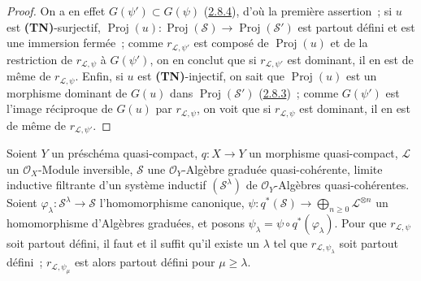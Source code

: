 \begin{proof}
On a en effet $G(\psi')\subset G(\psi)$
(\hyperref[II.2.8.4-fr]{2.8.4}), d'où la première assertion~; si $u$ est
\textbf{(TN)}-surjectif,
$\operatorname{Proj}(u):\operatorname{Proj}(\mathcal{S})\to
\operatorname{Proj}(\mathcal{S}')$ est partout défini et est une immersion
fermée~; comme $r_{\mathcal{L},\psi'}$ est composé de
$\operatorname{Proj}(u)$ et de la restriction de $r_{\mathcal{L},\psi}$ à
$G(\psi')$, on en conclut que si $r_{\mathcal{L},\psi'}$ est dominant, il en
est de même de $r_{\mathcal{L},\psi}$. Enfin, si $u$ est
\textbf{(TN)}-injectif, on sait que $\operatorname{Proj}(u)$ est un morphisme
dominant de $G(u)$ dans $\operatorname{Proj}(\mathcal{S}')$
(\hyperref[II.2.8.3-fr]{2.8.3})~; comme $G(\psi')$ est l'image réciproque de
$G(u)$ par $r_{\mathcal{L},\psi}$, on voit que si $r_{\mathcal{L},\psi}$ est
dominant, il en est de même de $r_{\mathcal{L},\psi'}$.
\end{proof}

\begin{proposition}[3.7.7]
\label{II.3.7.7-fr}
Soient $Y$ un préschéma quasi-compact, $q:X\to Y$ un morphisme quasi-compact,
$\mathcal{L}$ un $\mathcal{O}_X$-Module inversible, $\mathcal{S}$ une
$\mathcal{O}_Y$-Algèbre graduée quasi-cohérente, limite inductive filtrante
d'un système inductif $(\mathcal{S}^\lambda)$ de $\mathcal{O}_Y$-Algèbres
quasi-cohérentes. Soient
$\varphi_\lambda:\mathcal{S}^\lambda\to\mathcal{S}$ l'homomorphisme
canonique,
$\psi:q^*(\mathcal{S})\to\bigoplus_{n\geq0}\mathcal{L}^{\otimes n}$ un
homomorphisme d'Algèbres graduées, et posons
$\psi_\lambda=\psi\circ q^*(\varphi_\lambda)$. Pour que
$r_{\mathcal{L},\psi}$ soit partout défini, il faut et il suffit qu'il existe
un $\lambda$ tel que $r_{\mathcal{L},\psi_\lambda}$ soit partout défini~;
$r_{\mathcal{L},\psi_\mu}$ est alors partout défini pour $\mu\geq\lambda$.
\end{proposition}

